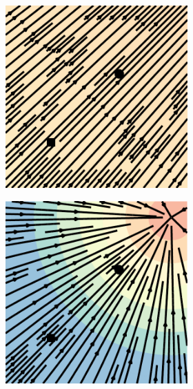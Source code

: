 \documentclass{article}
\begin{document}
\begin{figure}
\begin{subfigure}[t]{0.43\linewidth}
\begin{subfigure}[t]{0.23\linewidth}
        \vspace{-1.5em}
        \caption*{}
    \end{subfigure}
    \begin{subfigure}[t]{0.23\linewidth}
        \centering
        \includegraphics[width=\linewidth]{figures/plots/2d_vf_flow_match_dif_1.pdf}
        \vspace{-1.5em}
        \caption*{}
    \end{subfigure}
    \begin{subfigure}[t]{0.23\linewidth}
        \centering
        \includegraphics[width=\linewidth]{figures/plots/2d_vf_flow_match_dif_2.pdf}

\end{subfigure}
\end{subfigure}
\end{figure}
\end{document}
